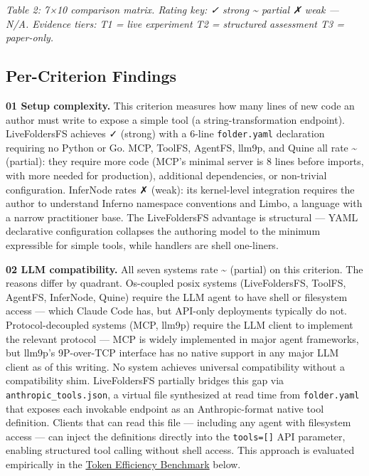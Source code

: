 \documentclass[
  11pt,
]{article}
\begin{document}
\emph{Table 2: 7×10 comparison matrix. Rating key: ✓ strong \textbar{}
\textasciitilde{} partial \textbar{} ✗ weak \textbar{} --- N/A. Evidence
tiers: T1 = live experiment \textbar{} T2 = structured assessment
\textbar{} T3 = paper-only.}

\hypertarget{per-criterion-findings}{%
\subsection{Per-Criterion Findings}\label{per-criterion-findings}}

\textbf{01 Setup complexity.} This criterion measures how many lines of
new code an author must write to expose a simple tool (a
string-transformation endpoint). LiveFoldersFS achieves ✓ (strong) with
a 6-line \texttt{folder.yaml} declaration requiring no Python or Go.
MCP, ToolFS, AgentFS, llm9p, and Quine all rate \textasciitilde{}
(partial): they require more code (MCP's minimal server is 8 lines
before imports, with more needed for production), additional
dependencies, or non-trivial configuration. InferNode rates ✗ (weak):
its kernel-level integration requires the author to understand Inferno
namespace conventions and Limbo, a language with a narrow practitioner
base. The LiveFoldersFS advantage is structural --- YAML declarative
configuration collapses the authoring model to the minimum expressible
for simple tools, while handlers are shell one-liners.

\textbf{02 LLM compatibility.} All seven systems rate \textasciitilde{}
(partial) on this criterion. The reasons differ by quadrant. Os-coupled
posix systems (LiveFoldersFS, ToolFS, AgentFS, InferNode, Quine) require
the LLM agent to have shell or filesystem access --- which Claude Code
has, but API-only deployments typically do not. Protocol-decoupled
systems (MCP, llm9p) require the LLM client to implement the relevant
protocol --- MCP is widely implemented in major agent frameworks, but
llm9p's 9P-over-TCP interface has no native support in any major LLM
client as of this writing. No system achieves universal compatibility
without a compatibility shim. LiveFoldersFS partially bridges this gap
via \texttt{anthropic\_tools.json}, a virtual file synthesized at read
time from \texttt{folder.yaml} that exposes each invokable endpoint as
an Anthropic-format native tool definition. Clients that can read this
file --- including any agent with filesystem access --- can inject the
definitions directly into the \texttt{tools={[}{]}} API parameter,
enabling structured tool calling without shell access. This approach is
evaluated empirically in the
\protect\hyperlink{token-efficiency-benchmark}{Token Efficiency
Benchmark} below.
\end{document}
